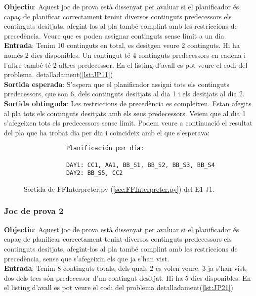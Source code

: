 \documentclass[a4paper]{article}
\begin{document}
	\noindent \textbf{Objectiu}: Aquest joc de prova està dissenyat per avaluar si el planificador és capaç de planificar correctament tenint diversos continguts predecessors els continguts desitjats, afegint-los al pla també complint amb les restriccions de precedència. Veure que es poden assignar continguts sense límit a un dia. \\
	
	\noindent \textbf{Entrada}: Tenim 10 continguts en total, es desitgen veure 2 continguts. Hi ha només 2 dies disponibles. Un contingut té 4 continguts predecessors en cadena i l'altre també té 2 altres predecessor. En el listing d'avall es pot veure el codi del problema.  detalladament(\ref{lst:JP11}) \\
	
	\noindent \textbf{Sortida esperada}: S'espera que el planificador assigni tots els continguts predecessors, que son 6, dels continguts desitjats al dia 1 i els desitjats al dia 2. \\
	
	\noindent \textbf{Sortida obtinguda}: Les restriccions de precedència es compleixen. Estan afegits al pla tots els continguts desitjats amb els seus predecessors. Veiem que al dia 1 s'afegeixen tots els predecessors sense límit. Podem veure a continuació el resultat del pla que ha trobat dia per dia i coincideix amb el que s'esperava:
	
	\begin{figure}[H]
		\centering
		\begin{verbatim}
			Planificación por día:
			
			DAY1: CC1, AA1, BB_S1, BB_S2, BB_S3, BB_S4
			DAY2: BB_S5, CC2	
		\end{verbatim}
		\caption{Sortida de FFInterpreter.py (\ref{sec:FFInterpreter.py}) del E1-J1.}
	\end{figure}	
	
	\subsubsection*{Joc de prova 2}
	
	\noindent \textbf{Objectiu}: Aquest joc de prova està dissenyat per avaluar si el planificador és capaç de planificar correctament tenint diversos continguts predecessors els continguts desitjats, afegint-los al pla també complint amb les restriccions de precedència, sense que s'afegeixin els que ja s'han vist. \\
	
	\noindent \textbf{Entrada}: Tenim 8 continguts totals, dels quals 2 es volen veure, 3 ja s'han vist, dos dels tres són predecessor d'un contingut desitjat. Hi ha 5 dies disponibles. En el listing d'avall es pot veure el codi del problema detalladament(\ref{lst:JP21}) \\
	
\end{document}
